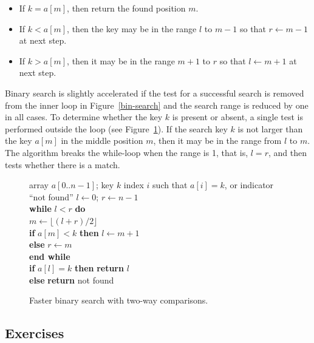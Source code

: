 \begin{itemize}
 \item If $k = a[m]$,
then return the found position $m$.
 \item If $k < a[m]$, then the key may be
in the range $l$ to $m-1$ so that $r\leftarrow m-1$ at next step. 
 \item If $k > a[m]$, then it
may be in the range $m+1$ to $r$ so that $l\leftarrow m+1$ at next step. 
\end{itemize}

Binary search is slightly accelerated if the test for a successful
search is removed from the inner loop in Figure~\ref{bin-search} and the
search range is reduced by one in all cases. To determine whether
the key $k$ is present or absent, a single test is performed outside the
loop (see Figure~\ref{fast-bin-search}). If the search key $k$ is not
larger than the key $a[m]$ in the middle position $m$, then it may be in
the range from $l$ to $m$. The algorithm breaks the while-loop when the
range is 1, that is, $l = r$, and then tests whether there is a match.

\begin{figure}[htb!]
\hspace*{1.3in}\begin{minipage}{5in}
{array $a[0..n-1]$; key $k$}
{index $i$ such that $a[i] = k$, or indicator ``not found''}
{
\> $l \leftarrow 0$; $r\leftarrow n-1$\\
\> \textbf{while} $l < r$ \textbf{do}\\ 
\> \>$m\leftarrow\lfloor(l + r)/2\rfloor$\\
\> \>\textbf{if} $a[m] < k$
               \textbf{then} $l\leftarrow m+1$\\
\> \>\textbf{else} $r \leftarrow m$\\
\> \textbf{end while}\\
\> \textbf{if} $a[l] = k$ \textbf{then} 
                \textbf{return} $l$ \\
\> \textbf{else} \textbf{return} \textsf{not found} \\
}
\end{minipage}
\caption{\label{fast-bin-search} Faster binary search with two-way
comparisons.}
\end{figure}

\subsection*{Exercises}


